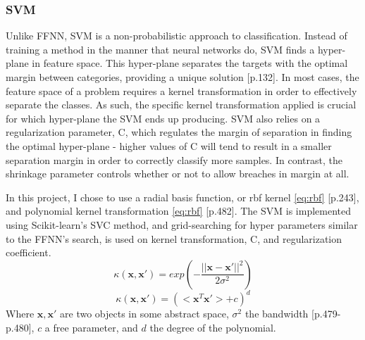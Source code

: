 \documentclass[%
oneside,                 %
final,                   %
10pt]{article}
\begin{document}
\subsubsection{SVM} \label{SVM}
Unlike FFNN, SVM is a non-probabilistic approach to classification. Instead of training a method in the manner that neural networks do, SVM finds a hyper-plane in feature space. This hyper-plane separates the targets with the optimal margin between categories, providing a unique solution \citep{HastieTrevor2009TEoS}[p.132]. In most cases, the feature space of a problem requires a kernel transformation in order to effectively separate the classes. As such, the specific kernel transformation applied is crucial for which hyper-plane the SVM ends up producing. SVM also relies on a regularization parameter, C, which regulates the margin of separation in finding the  optimal hyper-plane - higher values of C will tend to result in a smaller separation margin in order to correctly classify more samples. In contrast, the shrinkage parameter controls whether or not to allow breaches in margin at all.
	
In this project, I chose to use a radial basis function, or rbf kernel \eqref{eq:rbf} \citep{2002PRwS}[p.243], and polynomial kernel transformation \eqref{eq:rbf} \citep{MLMurphy}[p.482]. The SVM is implemented using Scikit-learn's SVC method, and grid-searching for hyper parameters similar to the FFNN's search, is used on kernel transformation, C, and regularization coefficient.
\begin{equation}
\kappa(\bm x, \bm x') = exp(-\frac{||\bm x - \bm x'||^2}{2 \sigma^2})
\label{eq:rbf}
\end{equation}
\begin{equation}
\kappa(\bm x, \bm x') = (<\bm x^T \bm x'> +c)^d
\label{linear}
\end{equation}
Where $\bm x, \bm x'$ are two objects in some abstract space, $\sigma^2$ the bandwidth \citep{MLMurphy}[p.479-p.480], $c$ a free parameter, and $d$ the degree of the polynomial.
\end{document}
